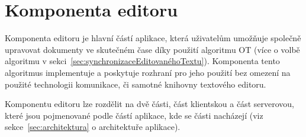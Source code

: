 
\section{Komponenta editoru}\label{sec:komponentaEditoru}

Komponenta editoru je hlavní částí aplikace, která uživatelům umožňuje společně upravovat dokumenty ve skutečném čase díky použití algoritmu \gls{OT} (více o volbě algoritmu v sekci~\ref{sec:synchronizaceEditovanéhoTextu}).
Komponenta tento algoritmus implementuje a poskytuje rozhraní pro jeho použití bez omezení na použité technologii komunikace, či samotné knihovny textového editoru.

Komponentu editoru lze rozdělit na dvě části, část klientskou a část serverovou, které jsou pojmenované podle částí aplikace, kde se části nacházejí (viz sekce~\ref{sec:architektura} o architektuře aplikace).



